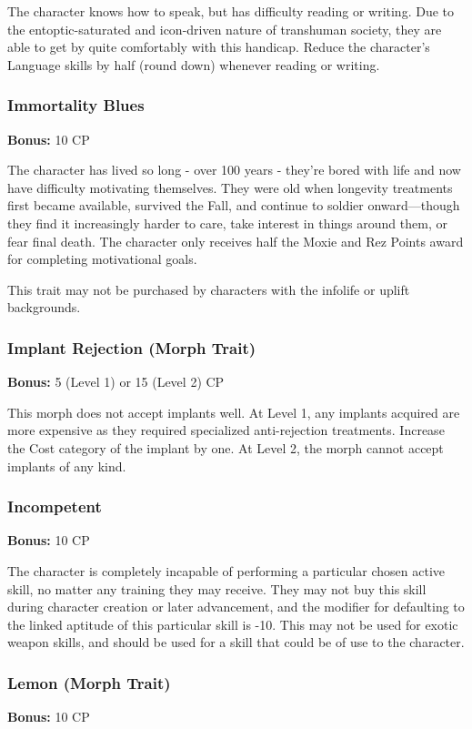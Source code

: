 The character knows how to speak, but has difficulty reading or writing. Due
to the entoptic-saturated and icon-driven nature of transhuman society, they
are able to get by quite comfortably with this handicap.  Reduce the
character’s Language skills by half (round down) whenever reading or writing.

\subsubsection{Immortality Blues}
\textbf{Bonus:} 10 CP

The character has lived so long - over 100 years - they’re bored with life and
now have difficulty motivating themselves. They were old when longevity
treatments first became available, survived the Fall, and continue to soldier
onward—though they find it increasingly harder to care, take interest in things
around them, or fear final death. The character only receives half the Moxie
and Rez Points award for completing motivational goals.

This trait may not be purchased by characters with the infolife or uplift
backgrounds.

\subsubsection{Implant Rejection (Morph Trait)}
\textbf{Bonus:} 5 (Level 1) or 15 (Level 2) CP

This morph does not accept implants well. At Level 1, any implants acquired are
more expensive as they required specialized anti-rejection treatments. Increase
the Cost category of the implant by one. At Level 2, the morph cannot accept
implants of any kind.

\subsubsection{Incompetent}
\textbf{Bonus:} 10 CP

The character is completely incapable of performing a particular chosen active
skill, no matter any training they may receive. They may not buy this skill
during character creation or later advancement, and the modifier for defaulting
to the linked aptitude of this particular skill is -10. This may not be used
for exotic weapon skills, and should be used for a skill that could be of use
to the character.

\subsubsection{Lemon (Morph Trait)}
\textbf{Bonus:} 10 CP

